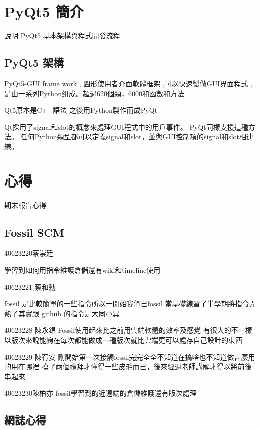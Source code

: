 \documentclass[12pt,,]{report}
\begin{document}
\hypertarget{pyqt5-ux7c21ux4ecb}{%
\chapter{PyQt5 簡介}\label{pyqt5-ux7c21ux4ecb}}

說明 PyQt5 基本架構與程式開發流程

\hypertarget{pyqt5-ux67b6ux69cb}{%
\section{PyQt5 架構}\label{pyqt5-ux67b6ux69cb}}

PyQt5-GUI frame work , 圖形使用者介面軟體框架 ,可以快速製做GUI界面程式 ,
是由一系列Python组成。超過620個類，6000和函數和方法

Qt5原本是C++語法 之後用Python製作而成PyQt

Qt採用了signal和slot的概念來處理GUI程式中的用戶事件。
PyQt同樣支援這種方法。
任何Python類型都可以定義signal和slot，並與GUI控制項的signal和slot相連線。

\hypertarget{ux5fc3ux5f97}{%
\chapter{心得}\label{ux5fc3ux5f97}}

期末報告心得

\hypertarget{fossil-scm}{%
\section{Fossil SCM}\label{fossil-scm}}

40623220蔡崇廷

學習到如何用指令維護倉儲還有wiki和timeline使用

40623221 蔡和勳

fossil 是比較簡單的一些指令所以一開始我們已fossil
當基礎練習了半學期將指令弄熟了其實跟 github 的指令是大同小異

40623228 陳永錩 Fossil使用起來比之前用雲端軟體的效率及感覺
有很大的不一樣以版次來說能夠在每次都能做成一種版次就比雲端更可以處存自己設計的東西

40623229 陳宥安
剛開始第一次接觸fossil完完全全不知道在搞啥也不知道做甚麼用的用在哪裡
摸了兩個禮拜才懂得一些皮毛而已，後來經過老師講解才得以將前後串起來

40623230陳柏亦 fossil學習到的近遠端的倉儲維護還有版次處理

\hypertarget{ux7db2ux8a8cux5fc3ux5f97}{%
\section{網誌心得}\label{ux7db2ux8a8cux5fc3ux5f97}}
\end{document}
